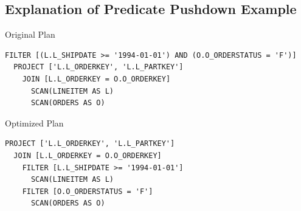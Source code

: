 \documentclass[12pt]{article}
\begin{document}
\subsection*{Explanation of Predicate Pushdown Example}

Original Plan  
\begin{verbatim}
FILTER [(L.L_SHIPDATE >= '1994-01-01') AND (O.O_ORDERSTATUS = 'F')]
  PROJECT ['L.L_ORDERKEY', 'L.L_PARTKEY']
    JOIN [L.L_ORDERKEY = O.O_ORDERKEY]
      SCAN(LINEITEM AS L)
      SCAN(ORDERS AS O)
\end{verbatim}

Optimized Plan  
\begin{verbatim}
PROJECT ['L.L_ORDERKEY', 'L.L_PARTKEY']
  JOIN [L.L_ORDERKEY = O.O_ORDERKEY]
    FILTER [L.L_SHIPDATE >= '1994-01-01']
      SCAN(LINEITEM AS L)
    FILTER [O.O_ORDERSTATUS = 'F']
      SCAN(ORDERS AS O)
\end{verbatim}
\end{document}
